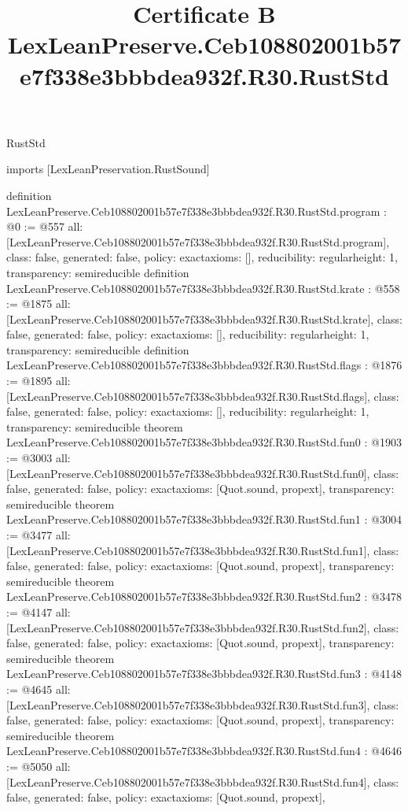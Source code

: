 \begin{lexlean}{RustStd}
\title{Certificate B LexLeanPreserve.Ceb108802001b57e7f338e3bbbdea932f.R30.RustStd}
\begin{coremodule}
imports [LexLeanPreservation.RustSound]

definition LexLeanPreserve.Ceb108802001b57e7f338e3bbbdea932f.R30.RustStd.program : @0 := @557 {
  all: [LexLeanPreserve.Ceb108802001b57e7f338e3bbbdea932f.R30.RustStd.program],
  class: false,
  generated: false,
  policy: exact{axioms: []},
  reducibility: regular{height: 1},
  transparency: semireducible
}
definition LexLeanPreserve.Ceb108802001b57e7f338e3bbbdea932f.R30.RustStd.krate : @558 := @1875 {
  all: [LexLeanPreserve.Ceb108802001b57e7f338e3bbbdea932f.R30.RustStd.krate],
  class: false,
  generated: false,
  policy: exact{axioms: []},
  reducibility: regular{height: 1},
  transparency: semireducible
}
definition LexLeanPreserve.Ceb108802001b57e7f338e3bbbdea932f.R30.RustStd.flags : @1876 := @1895 {
  all: [LexLeanPreserve.Ceb108802001b57e7f338e3bbbdea932f.R30.RustStd.flags],
  class: false,
  generated: false,
  policy: exact{axioms: []},
  reducibility: regular{height: 1},
  transparency: semireducible
}
theorem LexLeanPreserve.Ceb108802001b57e7f338e3bbbdea932f.R30.RustStd.fun0 : @1903 := @3003 {
  all: [LexLeanPreserve.Ceb108802001b57e7f338e3bbbdea932f.R30.RustStd.fun0],
  class: false,
  generated: false,
  policy: exact{axioms: [Quot.sound, propext]},
  transparency: semireducible
}
theorem LexLeanPreserve.Ceb108802001b57e7f338e3bbbdea932f.R30.RustStd.fun1 : @3004 := @3477 {
  all: [LexLeanPreserve.Ceb108802001b57e7f338e3bbbdea932f.R30.RustStd.fun1],
  class: false,
  generated: false,
  policy: exact{axioms: [Quot.sound, propext]},
  transparency: semireducible
}
theorem LexLeanPreserve.Ceb108802001b57e7f338e3bbbdea932f.R30.RustStd.fun2 : @3478 := @4147 {
  all: [LexLeanPreserve.Ceb108802001b57e7f338e3bbbdea932f.R30.RustStd.fun2],
  class: false,
  generated: false,
  policy: exact{axioms: [Quot.sound, propext]},
  transparency: semireducible
}
theorem LexLeanPreserve.Ceb108802001b57e7f338e3bbbdea932f.R30.RustStd.fun3 : @4148 := @4645 {
  all: [LexLeanPreserve.Ceb108802001b57e7f338e3bbbdea932f.R30.RustStd.fun3],
  class: false,
  generated: false,
  policy: exact{axioms: [Quot.sound, propext]},
  transparency: semireducible
}
theorem LexLeanPreserve.Ceb108802001b57e7f338e3bbbdea932f.R30.RustStd.fun4 : @4646 := @5050 {
  all: [LexLeanPreserve.Ceb108802001b57e7f338e3bbbdea932f.R30.RustStd.fun4],
  class: false,
  generated: false,
  policy: exact{axioms: [Quot.sound, propext]},
}
\end{coremodule}
\end{lexlean}
